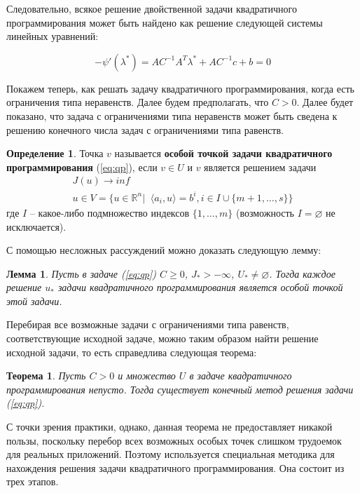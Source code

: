 \documentclass[a4paper, 12pt, titlepage]{article}
\theoremstyle{definition}
\newtheorem{SmartDefinition}{Определение}
\theoremstyle{plain}
\newtheorem{SmartTheorem}{Теорема}
\theoremstyle{plain}
\newtheorem{SmartLemma}{Лемма}
\begin{document}
Следовательно, всякое решение двойственной задачи квадратичного программирования
может быть найдено как решение следующей системы линейных уравнений:

\begin{equation}
 - \psi'(\lambda^{*}) = A C^{-1} A^{T} \lambda^{*} + A C^{-1} c + b = 0
\end{equation}

Покажем теперь, как решать задачу квадратичного программирования, когда есть
ограничения типа неравенств. Далее будем предполагать, что $C > 0$. Далее будет
показано, что задача с ограничениями типа неравенств может быть сведена к 
решению конечного числа задач с ограничениями типа равенств.

\begin{SmartDefinition}
 Точка $v$ называется \textbf{особой точкой задачи квадратичного 
 программирования} (\ref{eq:qp}), если $v \in U$ и $v$ является решением задачи
 \begin{equation}
 \label{eq:spec-point}
  \begin{aligned}
    J(u) \to inf \\
    u \in V = \{u \in \mathbb{R}^{n} | \;\; \langle a_{i}, u \rangle = b^{i},
    i \in I \cup \{m + 1, \ldots, s\}\}
  \end{aligned}
 \end{equation}
 где $I$ -- какое-либо подмножество индексов $\{1, \ldots, m\}$ (возможность
 $I = \varnothing$ не исключается).
\end{SmartDefinition}

С помощью несложных рассуждений можно доказать следующую лемму:

\begin{SmartLemma}
 Пусть в задаче (\ref{eq:qp}) $C \geq 0$, $J_{*} > - \infty$,
 $U_{*} \neq \varnothing$. Тогда каждое решение $u_{*}$ задачи квадратичного 
 программирования является особой  точкой этой задачи.
\end{SmartLemma}

Перебирая все возможные задачи с ограничениями типа равенств, соответствующие
исходной задаче, можно таким образом найти решение исходной задачи, то есть
справедлива следующая теорема:

\begin{SmartTheorem}
 Пусть $C > 0$ и множество $U$ в задаче квадратичного программирования непусто.
 Тогда существует конечный метод решения задачи (\ref{eq:qp}).
\end{SmartTheorem}

С точки зрения практики, однако, данная теорема не предоставляет никакой пользы,
поскольку перебор всех возможных особых точек слишком трудоемок для реальных
приложений. Поэтому используется специальная методика для нахождения решения
задачи квадратичного программирования. Она состоит из трех этапов.
\end{document}
